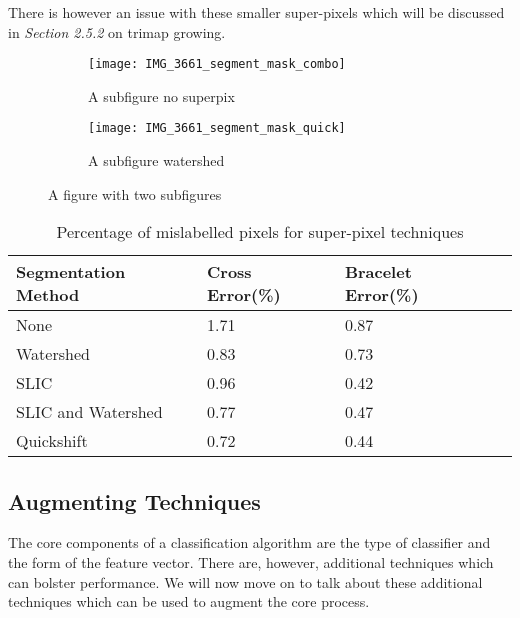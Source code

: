 \documentclass[12pt]{IIBproject}
\begin{document}
There is however an issue with these smaller super-pixels which will be discussed in \emph{Section 2.5.2} on trimap growing.

\begin{figure}[H]
\centering
\begin{subfigure}{.45\textwidth}
  \centering
  \texttt{[image: IMG\_3661\_segment\_mask\_combo]}
  \caption{A subfigure no superpix}
  \label{fig:sub2}
\end{subfigure}
\begin{subfigure}{.45\textwidth}
  \centering
  \texttt{[image: IMG\_3661\_segment\_mask\_quick]}
  \caption{A subfigure watershed}
  \label{fig:sub1}
\end{subfigure}%


\caption{A figure with two subfigures}
\label{fig:test}
\end{figure}








\begin{table}[H]
\begin{center}
    \begin{tabular}{ | l | l | l | p{5cm} |}
    \hline
    Segmentation Method & Cross Error(\%) & Bracelet Error(\%) \\ \hline
    None & 1.71 & 0.87 \\ \hline
    Watershed & 0.83 & 0.73 \\ \hline
    SLIC & 0.96 & 0.42 \\ \hline
    SLIC and Watershed & 0.77 & 0.47 \\ \hline
    Quickshift & 0.72 & 0.44 \\
    \hline
     
    \end{tabular}
    \caption{Percentage of mislabelled pixels for super-pixel techniques}\label{table:somename}
\end{center}
\end{table}
\subsection{Augmenting Techniques}
The core components of a classification algorithm are the type of classifier and the form of the feature vector. There are, however, additional techniques which can bolster performance. We will now move on to talk about these additional techniques which can be used to augment the core process.
\end{document}

